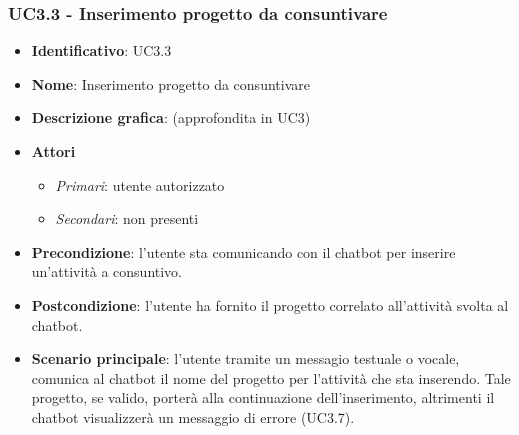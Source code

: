 \subsubsection{UC3.3 - Inserimento progetto da consuntivare}
\begin{itemize}
    \item \textbf{Identificativo}: UC3.3 
    \item \textbf{Nome}: Inserimento progetto da consuntivare  
    \item \textbf{Descrizione grafica}: (approfondita in UC3)
    \item \textbf{Attori}
        \begin{itemize} 
            \item \textit{Primari}: utente autorizzato
            \item \textit{Secondari}: non presenti
        \end{itemize}
    \item \textbf{Precondizione}: l'utente sta comunicando con il chatbot per inserire un'attività a consuntivo. 
    \item \textbf{Postcondizione}: l'utente ha fornito il progetto correlato all'attività svolta al chatbot. 
    \item \textbf{Scenario principale}: l'utente tramite un messagio testuale o vocale, comunica al chatbot il nome del progetto per l'attività che sta inserendo. Tale progetto, se valido, porterà alla continuazione dell'inserimento, altrimenti il chatbot visualizzerà un messaggio di errore (UC3.7). 
\end{itemize}

